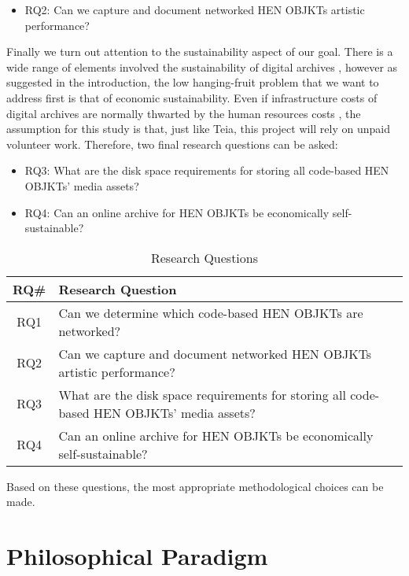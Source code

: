 \begin{itemize}
	\item RQ2: Can we capture and document networked HEN OBJKTs artistic performance?
\end{itemize}

Finally we turn out attention to the sustainability aspect of our goal. There is a wide range of elements involved the sustainability of digital archives \cite{visDigitalArchivingSustainable2024}, however as suggested in the introduction, the low hanging-fruit problem that we want to address first is that of economic sustainability. Even if infrastructure costs of digital archives are normally thwarted by the human resources costs \cite{CostsDigitalRepositories}, the assumption for this study is that, just like Teia, this project will rely on unpaid volunteer work. Therefore, two final research questions can be asked: 

\begin{itemize}
	\item RQ3: What are the disk space requirements for storing all code-based HEN OBJKTs' media assets?
	\item RQ4: Can an online archive for HEN OBJKTs be economically self-sustainable?
\end{itemize}

\vspace{0.5cm}

\begin{table}[h!]
\centering
\begin{tabular}{|c|p{10cm}|}
\hline
\textbf{RQ\#} & \textbf{Research Question} \\ \hline
RQ1 & Can we determine which code-based HEN OBJKTs are networked? \\ \hline
RQ2 & Can we capture and document networked HEN OBJKTs artistic performance? \\ \hline
RQ3 & What are the disk space requirements for storing all code-based HEN OBJKTs' media assets? \\ \hline
RQ4 & Can an online archive for HEN OBJKTs be economically self-sustainable? \\ \hline
\end{tabular}
\caption{Research Questions}
\end{table}


Based on these questions, the most appropriate methodological choices can be made.

\section{Philosophical Paradigm}

